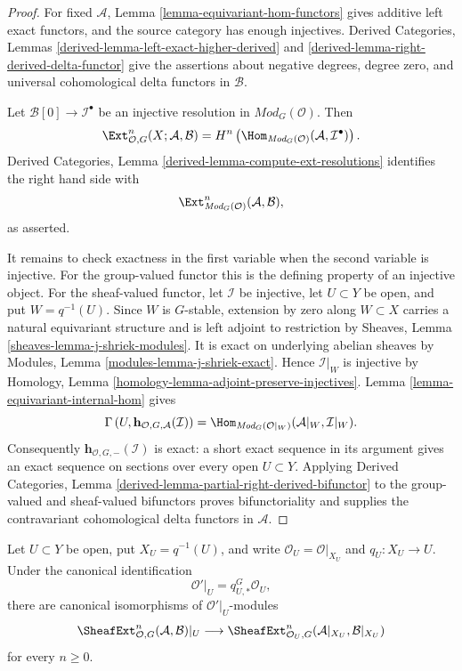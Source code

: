 \begin{proof}
For fixed $\mathcal A$, Lemma \ref{lemma-equivariant-hom-functors} gives
additive left exact functors, and the source category has enough injectives.
Derived Categories, Lemmas \ref{derived-lemma-left-exact-higher-derived} and
\ref{derived-lemma-right-derived-delta-functor} give the assertions about
negative degrees, degree zero, and universal cohomological delta functors in
$\mathcal B$.

Let $\mathcal B[0]\to\mathcal I^\bullet$ be an injective resolution in
$\textit{Mod}_G(\mathcal O)$. Then
$$
\Ext^n_{\mathcal O,G}(X;\mathcal A,\mathcal B)
=
H^n\left(
\Hom_{\textit{Mod}_G(\mathcal O)}
(\mathcal A,\mathcal I^\bullet)
\right).
$$
Derived Categories, Lemma \ref{derived-lemma-compute-ext-resolutions}
identifies the right hand side with
$$
\Ext^n_{\textit{Mod}_G(\mathcal O)}(\mathcal A,\mathcal B),
$$
as asserted.

It remains to check exactness in the first variable when the second variable
is injective. For the group-valued functor this is the defining property of
an injective object. For the sheaf-valued functor, let $\mathcal I$ be
injective, let $U\subset Y$ be open, and put $W=q^{-1}(U)$. Since $W$ is
$G$-stable, extension by zero along $W\subset X$ carries a natural
equivariant structure and is left adjoint to restriction by Sheaves, Lemma
\ref{sheaves-lemma-j-shriek-modules}. It is exact on underlying abelian
sheaves by
Modules, Lemma \ref{modules-lemma-j-shriek-exact}. Hence
$\mathcal I|_W$ is injective by Homology, Lemma
\ref{homology-lemma-adjoint-preserve-injectives}. Lemma
\ref{lemma-equivariant-internal-hom} gives
$$
\Gamma\left(
U,\mathbf h_{\mathcal O,G,\mathcal A}(\mathcal I)
\right)
=
\Hom_{\textit{Mod}_G(\mathcal O|_W)}
(\mathcal A|_W,\mathcal I|_W).
$$
Consequently $\mathbf h_{\mathcal O,G,-}(\mathcal I)$ is exact: a short
exact sequence in its argument gives an exact sequence on sections over
every open $U\subset Y$. Applying Derived Categories, Lemma
\ref{derived-lemma-partial-right-derived-bifunctor} to the group-valued and
sheaf-valued bifunctors proves bifunctoriality and supplies the contravariant
cohomological delta functors in $\mathcal A$.
\end{proof}

\begin{lemma}
\label{lemma-localize-equivariant-ext}
\begin{reference}
\cite[Chapter V, \S 5.6, formula (5.6.8), p. 214]{Tohoku}
\end{reference}
Let $U\subset Y$ be open, put $X_U=q^{-1}(U)$, and write
$\mathcal O_U=\mathcal O|_{X_U}$ and $q_U:X_U\to U$. Under the canonical
identification
$$
\mathcal O'|_U=q_{U,*}^G\mathcal O_U,
$$
there are canonical isomorphisms of $\mathcal O'|_U$-modules
$$
\SheafExt^n_{\mathcal O,G}(\mathcal A,\mathcal B)|_U
\longrightarrow
\SheafExt^n_{\mathcal O_U,G}
(\mathcal A|_{X_U},\mathcal B|_{X_U})
$$
for every $n\geq 0$.
\end{lemma}

